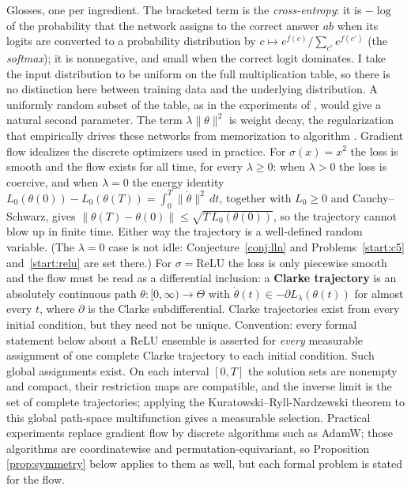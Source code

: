 \documentclass[11pt]{amsart}
\theoremstyle{plain}
\theoremstyle{definition}
\begin{document}
Glosses, one per ingredient. The bracketed term is the \emph{cross-entropy}: it is $-\log$ of the probability that the network assigns to the correct answer $ab$ when its logits are converted to a probability distribution by $c \mapsto e^{f(c)}/\sum_{c'} e^{f(c')}$ (the \emph{softmax}); it is nonnegative, and small when the correct logit dominates. I take the input distribution to be uniform on the full multiplication table, so there is no distinction here between training data and the underlying distribution. A uniformly random subset of the table, as in the experiments of \cite{nanda2023}, would give a natural second parameter. The term $\lambda \|\theta\|^2$ is weight decay, the regularization that empirically drives these networks from memorization to algorithm \cite{nanda2023,power2022}. Gradient flow idealizes the discrete optimizers used in practice. For $\sigma(x) = x^2$ the loss is smooth and the flow exists for all time, for every $\lambda \geq 0$: when $\lambda > 0$ the loss is coercive, and when $\lambda = 0$ the energy identity $L_0(\theta(0)) - L_0(\theta(T)) = \int_0^T \|\dot\theta\|^2\,dt$, together with $L_0 \geq 0$ and Cauchy--Schwarz, gives $\|\theta(T) - \theta(0)\| \leq \sqrt{T\, L_0(\theta(0))}$, so the trajectory cannot blow up in finite time. Either way the trajectory is a well-defined random variable. (The $\lambda = 0$ case is not idle: Conjecture~\ref{conj:lln} and Problems~\ref{start:c5} and~\ref{start:relu} are set there.) For $\sigma = \mathrm{ReLU}$ the loss is only piecewise smooth and the flow must be read as a differential inclusion: a \textbf{Clarke trajectory} is an absolutely continuous path $\theta \colon [0,\infty) \to \Theta$ with $\dot\theta(t) \in -\partial L_\lambda(\theta(t))$ for almost every $t$, where $\partial$ is the Clarke subdifferential. Clarke trajectories exist from every initial condition, but they need not be unique. Convention: every formal statement below about a ReLU ensemble is asserted for \emph{every} measurable assignment of one complete Clarke trajectory to each initial condition. Such global assignments exist. On each interval $[0,T]$ the solution sets are nonempty and compact, their restriction maps are compatible, and the inverse limit is the set of complete trajectories; applying the Kuratowski--Ryll-Nardzewski theorem to this global path-space multifunction gives a measurable selection. Practical experiments replace gradient flow by discrete algorithms such as AdamW; those algorithms are coordinatewise and permutation-equivariant, so Proposition \ref{prop:symmetry} below applies to them as well, but each formal problem is stated for the flow.
\end{document}
